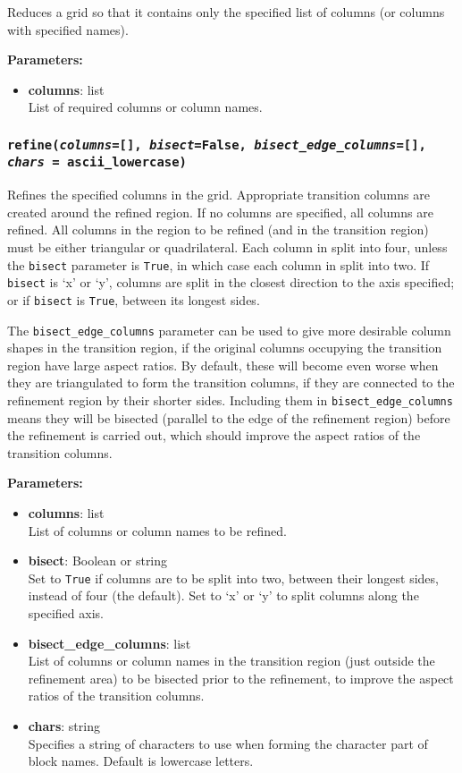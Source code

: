 Reduces a grid so that it contains only the specified list of columns (or columns with specified names).

\textbf{Parameters:}
\begin{itemize}
  \item \textbf{columns}: list\\
    List of required columns or column names.
\end{itemize}

\subsubsection{\texttt{refine(\emph{columns}=[], \emph{bisect}=False, \emph{bisect\_edge\_columns}=[],\\
    \emph{chars} = ascii\_lowercase)}}
\label{sec:refine}

Refines the specified columns in the grid.  Appropriate transition columns are created around the refined region.  If no columns are specified, all columns are refined.  All columns in the region to be refined (and in the transition region) must be either triangular or quadrilateral.  Each column in split into four, unless the \texttt{bisect} parameter is \texttt{True}, in which case each column in split into two.  If \texttt{bisect} is `x' or `y', columns are split in the closest direction to the axis specified; or if \texttt{bisect} is \texttt{True}, between its longest sides.

The \texttt{bisect\_edge\_columns} parameter can be used to give more desirable column shapes in the transition region, if the original columns occupying the transition region have large aspect ratios.  By default, these will become even worse when they are triangulated to form the transition columns, if they are connected to the refinement region by their shorter sides.  Including them in \texttt{bisect\_edge\_columns} means they will be bisected (parallel to the edge of the refinement region) before the refinement is carried out, which should improve the aspect ratios of the transition columns.

\textbf{Parameters:}
\begin{itemize}
  \item \textbf{columns}: list\\
    List of columns or column names to be refined.
  \item \textbf{bisect}: Boolean or string\\
    Set to \texttt{True} if columns are to be split into two, between their longest sides, instead of four (the default).  Set to `x' or `y' to split columns along the specified axis.
  \item \textbf{bisect\_edge\_columns}: list\\
    List of columns or column names in the transition region (just outside the refinement area) to be bisected prior to the refinement, to improve the aspect ratios of the transition columns.
  \item \textbf{chars}: string\\
    Specifies a string of characters to use when forming the character part of block names.  Default is lowercase letters.
\end{itemize}

